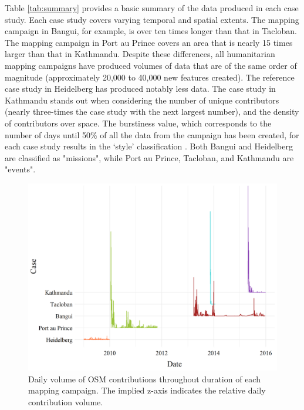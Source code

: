 Table \ref{tab:summary} provides a basic summary of the data produced in each case study. Each case study covers varying temporal and spatial extents. The mapping campaign in Bangui, for example, is over ten times longer than that in Tacloban. The mapping campaign in Port au Prince covers an area that is nearly 15 times larger than that in Kathmandu. Despite these differences, all humanitarian mapping campaigns have produced volumes of data that are of the same order of magnitude (approximately 20,000 to 40,000 new features created). The reference case study in Heidelberg has produced notably less data. The case study in Kathmandu stands out when considering the number of unique contributors (nearly three-times the case study with the next largest number), and the density of contributors over space. The burstiness value, which corresponds to the number of days until 50\% of all the data from the campaign has been created, for each case study results in the ‘style’ classification \parencite{dittus_mass_2017}. Both Bangui and Heidelberg are classified as "missions", while Port au Prince, Tacloban, and Kathmandu are "events". 

\begin{figure} %
    \centering %
    \includegraphics[width = \textwidth]{Images/overtime.png} %
    \caption[Daily volume of OSM contributions throughout duration of each mapping campaign.]{Daily volume of OSM contributions throughout duration of each mapping campaign. The implied z-axis indicates the relative daily contribution volume.} %
    \label{fig:time} %
\end{figure}

